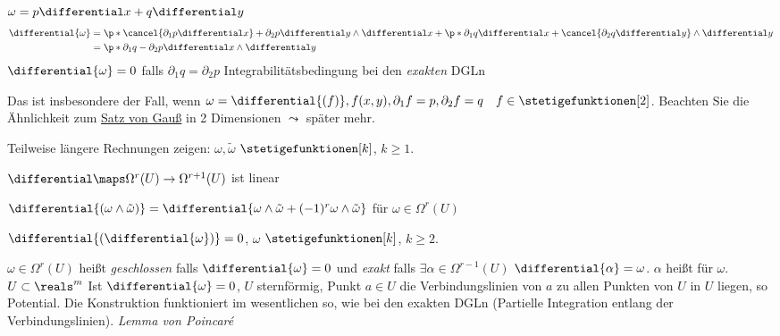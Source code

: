 \begin{beispiel}
  \( \omega=p\differential x+q\differential y \) 
  \begin{align*}
      \differential{\omega} &=  \p*{ \cancel{\partial_1p\differential x}+\partial_2p\differential y }\wedge \differential x
      +\p*{ \partial_1 q\differential x+\cancel{\partial_2 q\differential y} }\wedge \differential y\\
      &= \p*{ \partial_1 q-\partial_2 p }\differential x\wedge \differential y
  \end{align*}
  \( \differential{\omega}=0 \) falls \( \partial_1q=\partial_2p \) Integrabilitätsbedingung bei den \emph{exakten} DGLn

  Das ist insbesondere der Fall, wenn \( \omega=\differential{(f)}, f(x,y),\partial_1f=p,\partial_2f=q\quad f\in \stetigefunktionen[2] \).
  Beachten Sie die Ähnlichkeit zum \hyperref[integralsatz_gauss]{Satz von Gauß} in 2 Dimensionen \( \leadsto \) später mehr.
\end{beispiel}

\begin{bemdef}
    Teilweise längere Rechnungen zeigen: \( \omega,\tilde{\omega}\) \( \stetigefunktionen[k]\), \( k\ge 1. \)

    \( \differential\maps \Omega^r(U)\to\Omega^{r+1}(U) \) ist linear 

    \( \differential{(\omega\wedge\tilde{\omega})}=\differential{\omega\wedge\tilde{\omega}+(-1)^r\omega\wedge\tilde{\omega}} \) für \( \omega\in\Omega^r(U) \)

    \( \differential{(\differential{\omega})}=0 \), \( \omega\) \( \stetigefunktionen[k]\), \( k\ge 2 \).

    \( \omega\in\Omega^r(U) \) heißt \emph{geschlossen} falls \( \differential{\omega}=0 \) und \emph{exakt} falls \( \exists \alpha\in\Omega^{r-1}(U) \) \sd \( \differential{\alpha}=\omega \).
    \( \alpha \) heißt  für \( \omega \). \( U\subset\reals^m \)
    Ist \( \differential{\omega}=0 \), \( U \) sternförmig, \dh \texists Punkt \( a\in U \) \sd die Verbindungslinien von \( a \) zu allen Punkten von \( U \) in \( U \) liegen, so \texists Potential.
    Die Konstruktion funktioniert im wesentlichen so, wie bei den exakten DGLn (Partielle Integration entlang der Verbindungslinien).
    \emph{Lemma von Poincaré}
\end{bemdef}


